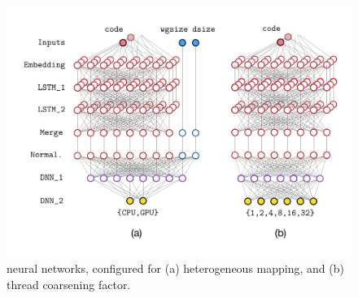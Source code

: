 \begin{figure}[t!]
	\centering
	\includegraphics[width=\columnwidth]{img/nn} %
	\vspace{-2.0em}%
	\caption{%
		\DeepTune neural networks, configured for (a) heterogeneous mapping, and (b) thread coarsening factor.%
	}%
	\label{fig:nn}
\end{figure}
